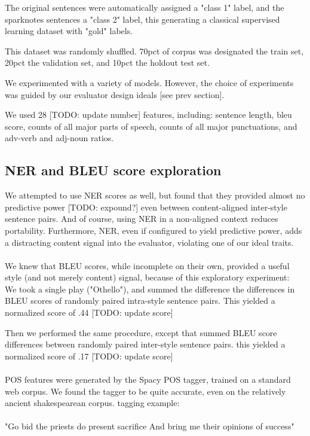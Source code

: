 \documentclass[letterpaper, 10 pt, conference]{ieeeconf}  %
\begin{document}
The original sentences were automatically assigned a "class 1" label, and the sparknotes sentences a "class 2" label, this generating a classical supervised learning dataset with "gold" labels.

This dataset was randomly shuffled. 70pct of corpus was designated the train set, 20pct the validation set, and 10pct the holdout test set.
 
We experimented with a variety of models. However, the choice of experiments was guided by our evaluator design ideals [see prev section].

We used 28 [TODO: update number] features, including:
sentence length, bleu score, counts of all major parts of speech, counts of all major punctuations, and adv-verb and adj-noun ratios. 

\subsection{NER and BLEU score exploration}
We attempted to use NER scores as well, but found that they provided almost no predictive power [TODO: expound?] even between content-aligned inter-style sentence pairs. And of course, using NER in a non-aligned context reduces portability. Furthermore, NER, even if configured to yield predictive power, adds a distracting content signal into the evaluator, violating one of our ideal traits.
\\ \\
We knew that BLEU scores, while incomplete on their own, provided a useful style (and not merely content) signal, because of this exploratory experiment:
\\
We took a single play ("Othello"), and summed the difference the differences in BLEU scores of randomly paired intra-style sentence pairs. This yielded a normalized score of .44 [TODO: update score]

Then we performed the same procedure, except that summed BLEU score differences between randomly paired inter-style sentence pairs. this yielded a normalized score of .17 [TODO: update score]
\\
\\
POS features were generated by the Spacy POS tagger, trained on a standard web corpus. We found the tagger to be quite accurate, even on the relatively ancient shakespearean corpus. tagging example:\\
\\
"Go bid the priests do present sacrifice And bring me their opinions of success"\\
\end{document}
